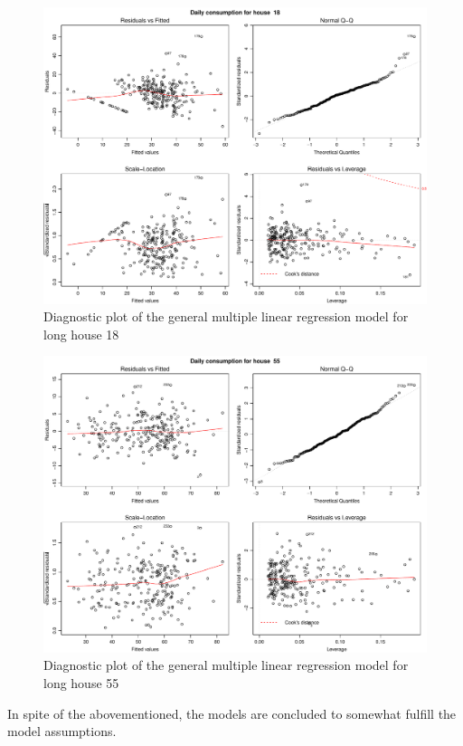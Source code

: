 \begin{figure}
    \centering
    \includegraphics[width=1.\textwidth]{../../../figures/general_lm18L.pdf}
    \caption{Diagnostic plot of the general multiple linear regression model for long house 18}
    \label{fig: general_lm18L}
\end{figure}
\begin{figure}
    \centering
    \includegraphics[width=1.\textwidth]{../../../figures/general_lm55L.pdf}
    \caption{Diagnostic plot of the general multiple linear regression model for long house 55}
    \label{fig: general_lm55L}
\end{figure}
\noindent In spite of the abovementioned, the models are concluded to somewhat fulfill the model assumptions. 

